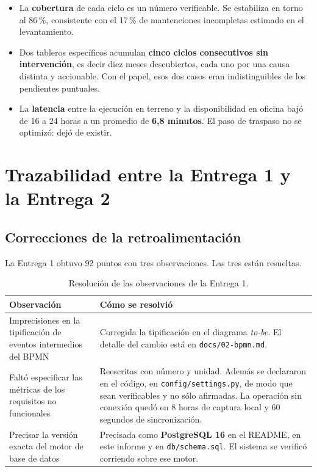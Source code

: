 \documentclass[10pt,letterpaper]{article}
\begin{document}
\begin{itemize}
  \item La \textbf{cobertura} de cada ciclo es un número verificable. Se
  estabiliza en torno al 86\,\%, consistente con el 17\,\% de mantenciones
  incompletas estimado en el levantamiento.
  \item Dos tableros específicos acumulan \textbf{cinco ciclos consecutivos sin
  intervención}, es decir diez meses descubiertos, cada uno por una causa
  distinta y accionable. Con el papel, esos dos casos eran indistinguibles de
  los pendientes puntuales.
  \item La \textbf{latencia} entre la ejecución en terreno y la disponibilidad
  en oficina bajó de 16 a 24 horas a un promedio de \textbf{6,8 minutos}. El
  paso de traspaso no se optimizó: dejó de existir.
\end{itemize}

\newpage

\section{Trazabilidad entre la Entrega 1 y la Entrega 2}

\subsection{Correcciones de la retroalimentación}

La Entrega 1 obtuvo 92 puntos con tres observaciones. Las tres están resueltas.

\begin{table}[H]
\centering
\small
\begin{tabular}{@{}p{5cm}p{10cm}@{}}
\toprule
\textbf{Observación} & \textbf{Cómo se resolvió} \\
\midrule
Imprecisiones en la tipificación de eventos intermedios del BPMN
& Corregida la tipificación en el diagrama \emph{to-be}. El detalle del cambio
está en \texttt{docs/02-bpmn.md}. \\
\addlinespace
Faltó especificar las métricas de los requisitos no funcionales
& Reescritas con número y unidad. Además se declararon en el código, en
\texttt{config/settings.py}, de modo que sean verificables y no sólo afirmadas.
La operación sin conexión quedó en 8 horas de captura local y 60 segundos de
sincronización. \\
\addlinespace
Precisar la versión exacta del motor de base de datos
& Precisada como \textbf{PostgreSQL 16} en el README, en este informe y en
\texttt{db/schema.sql}. El sistema se verificó corriendo sobre ese motor. \\
\bottomrule
\end{tabular}
\caption{Resolución de las observaciones de la Entrega 1.}
\end{table}
\end{document}
